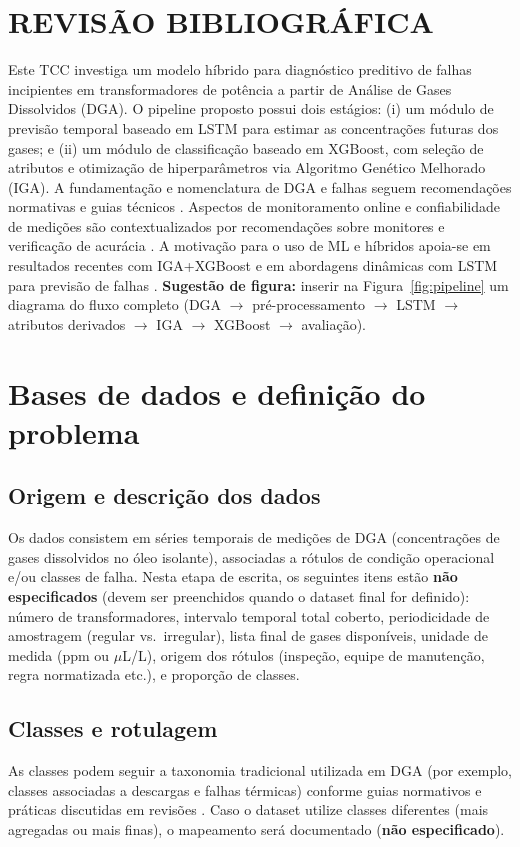 \section{REVISÃO BIBLIOGRÁFICA}
Este TCC investiga um modelo híbrido para
diagnóstico preditivo de falhas incipientes em transformadores de
potência a partir de Análise de Gases Dissolvidos (DGA).
O pipeline proposto possui dois estágios:
(i) um módulo de previsão temporal baseado em LSTM para estimar as
concentrações futuras dos gases; e
(ii) um módulo de classificação baseado em XGBoost, com seleção de atributos e otimização de hiperparâmetros via Algoritmo Genético Melhorado (IGA).
A fundamentação e nomenclatura de DGA e falhas seguem recomendações normativas e guias técnicos
\cite{iec60599_2022,ieee_c57_104_2019,cigre_tb771_2019}.
Aspectos de monitoramento online e confiabilidade de medições são
contextualizados por recomendações sobre monitores e verificação de acurácia \cite{cigre_tb783_2019}.
A motivação para o uso de ML e híbridos apoia-se em resultados
recentes com IGA+XGBoost \cite{wu2021_iga_xgboost} e em abordagens
dinâmicas com LSTM para previsão de falhas \cite{wang2023_lstm_dga}.
\textbf{Sugestão de figura:} inserir na Figura~\ref{fig:pipeline} um
diagrama do fluxo completo (DGA $\rightarrow$ pré-processamento $
\rightarrow$ LSTM $\rightarrow$ atributos derivados $\rightarrow$ IGA $
\rightarrow$ XGBoost $\rightarrow$ avaliação).

\section{Bases de dados e definição do problema}
\subsection{Origem e descrição dos dados}
Os dados consistem em séries temporais de medições de DGA
(concentrações de gases dissolvidos no óleo isolante), associadas a
rótulos de condição operacional e/ou classes de falha.
Nesta etapa de escrita, os seguintes itens estão \textbf{não
especificados} (devem ser preenchidos quando o dataset final for definido):
número de transformadores, intervalo temporal total coberto, periodicidade
de amostragem (regular vs.\ irregular), lista final de gases disponíveis,
unidade de medida (ppm ou $\mu$L/L), origem dos rótulos (inspeção,
equipe de manutenção, regra normatizada etc.), e proporção de
classes.

\subsection{Classes e rotulagem}
As classes podem seguir a taxonomia tradicional utilizada em DGA (por
exemplo, classes associadas a descargas e falhas térmicas) conforme guias
normativos \cite{iec60599_2022,ieee_c57_104_2019} e práticas discutidas em
revisões \cite{nanfak2024_traditional_dga_review,duval2002_review}.
Caso o dataset utilize classes diferentes (mais agregadas ou mais finas), o
mapeamento será documentado (\textbf{não especificado}).

